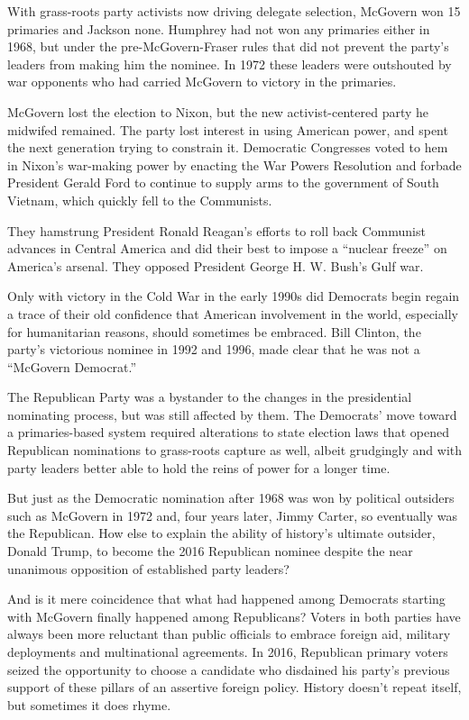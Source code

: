 With grass-roots party activists now driving delegate selection,
McGovern won 15 primaries and Jackson none. Humphrey had not won any
primaries either in 1968, but under the pre-McGovern-Fraser rules that
did not prevent the party's leaders from making him the nominee. In 1972
these leaders were outshouted by war opponents who had carried McGovern
to victory in the primaries.

McGovern lost the election to Nixon, but the new activist-centered party
he midwifed remained. The party lost interest in using American power,
and spent the next generation trying to constrain it. Democratic
Congresses voted to hem in Nixon's war-making power by enacting the War
Powers Resolution and forbade President Gerald Ford to continue to
supply arms to the government of South Vietnam, which quickly fell to
the Communists.

They hamstrung President Ronald Reagan's efforts to roll back Communist
advances in Central America and did their best to impose a ``nuclear
freeze'' on America's arsenal. They opposed President George H. W.
Bush's Gulf war.

Only with victory in the Cold War in the early 1990s did Democrats begin
regain a trace of their old confidence that American involvement in the
world, especially for humanitarian reasons, should sometimes be
embraced. Bill Clinton, the party's victorious nominee in 1992 and 1996,
made clear that he was not a ``McGovern Democrat.''

The Republican Party was a bystander to the changes in the presidential
nominating process, but was still affected by them. The Democrats' move
toward a primaries-based system required alterations to state election
laws that opened Republican nominations to grass-roots capture as well,
albeit grudgingly and with party leaders better able to hold the reins
of power for a longer time.

But just as the Democratic nomination after 1968 was won by political
outsiders such as McGovern in 1972 and, four years later, Jimmy Carter,
so eventually was the Republican. How else to explain the ability of
history's ultimate outsider, Donald Trump, to become the 2016 Republican
nominee despite the near unanimous opposition of established party
leaders?

And is it mere coincidence that what had happened among Democrats
starting with McGovern finally happened among Republicans? Voters in
both parties have always been more reluctant than public officials to
embrace foreign aid, military deployments and multinational agreements.
In 2016, Republican primary voters seized the opportunity to choose a
candidate who disdained his party's previous support of these pillars of
an assertive foreign policy. History doesn't repeat itself, but
sometimes it does rhyme.

